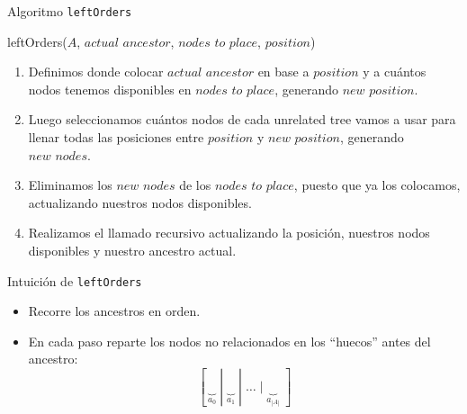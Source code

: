 \begin{frame}[noframenumbering][fragile]{Algoritmo \texttt{leftOrders}}
	\begin{algorithm}[H]
		\caption*{leftOrders($A$, $\textit{actual ancestor}$, $\textit{nodes to place}$, $position$)} \label{alg:leftOrdersAlgorithm}
		\begin{enumerate}
			\item Definimos donde colocar $\textit{actual ancestor}$ en base a $position$ y a cuántos nodos tenemos disponibles en $\textit{nodes to place}$, generando $\textit{new position}$.
			\item Luego seleccionamos cuántos nodos de cada unrelated tree vamos a usar para llenar todas las posiciones entre $position$ y $\textit{new position}$, generando $\textit{new nodes}$.
			\item Eliminamos los $\textit{new nodes}$ de los $\textit{nodes to place}$, puesto que ya los colocamos, actualizando nuestros nodos disponibles.
			\item Realizamos el llamado recursivo actualizando la posición, nuestros nodos disponibles y nuestro ancestro actual. 
		\end{enumerate}
	\end{algorithm}
\end{frame}

\begin{frame}[noframenumbering]{Intuición de \texttt{leftOrders}}
\begin{itemize}[<+- | alert@+>]
	\item Recorre los ancestros en orden.
	\item En cada paso reparte los nodos no relacionados en los “huecos” antes del ancestro:
	\[
	[\,\underbrace{\;\; }_{a_0}\;|\;\underbrace{\;\; }_{a_1}\;|\;\dots\;|\;\underbrace{\;\; }_{a_{|A|}}\;]
	\]
\end{itemize}
\end{frame}


